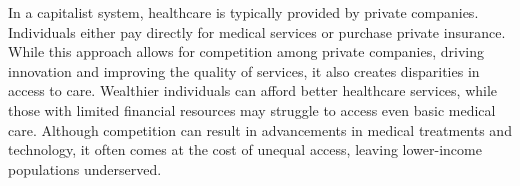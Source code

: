 \par
In a capitalist system, healthcare is typically provided by private companies. Individuals either pay directly for medical services or purchase private insurance. While this approach allows for competition among private companies, driving innovation and improving the quality of services, it also creates disparities in access to care. Wealthier individuals can afford better healthcare services, while those with limited financial resources may struggle to access even basic medical care. Although competition can result in advancements in medical treatments and technology, it often comes at the cost of unequal access, leaving lower-income populations underserved.